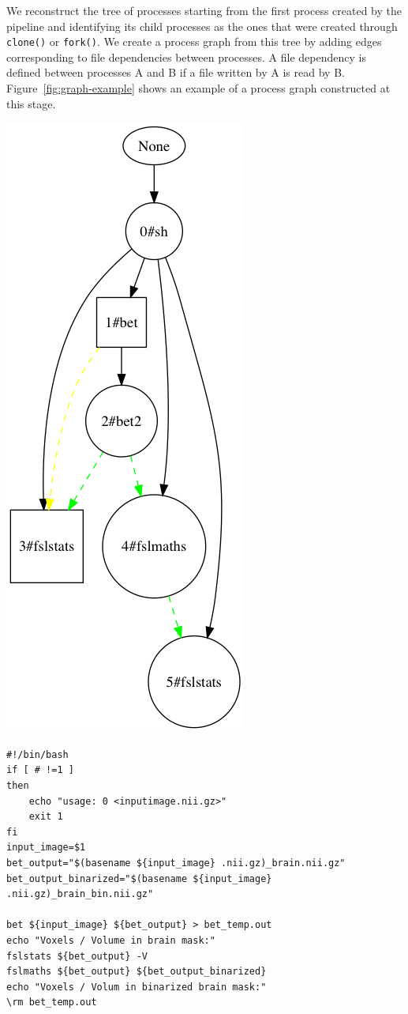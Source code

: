 \documentclass{article}
\begin{document}
We reconstruct the tree of processes starting from the first process
created by the pipeline and identifying its child processes as the ones
that were created through \texttt{clone()} or \texttt{fork()}. We
create a process graph from this tree by adding edges corresponding to
file dependencies between processes. A file dependency is defined
between processes A and B if a file written by A is read by
B. Figure~\ref{fig:graph-example} shows an example of a process graph
constructed at this stage.

\medskip
\noindent
\begin{minipage}[]{.5\linewidth}
  \centering
  \includegraphics[scale=0.2,width=.4\linewidth]{images/simple_graph}
\end{minipage}
\begin{minipage}[]{.3\linewidth}
\small{}\label{sample_script}
{\scriptsize
\begin{verbatim}
#!/bin/bash
if [ # !=1 ]
then
    echo "usage: 0 <inputimage.nii.gz>"
    exit 1
fi
input_image=$1
bet_output="$(basename ${input_image} .nii.gz)_brain.nii.gz"
bet_output_binarized="$(basename ${input_image} .nii.gz)_brain_bin.nii.gz"

bet ${input_image} ${bet_output} > bet_temp.out
echo "Voxels / Volume in brain mask:"
fslstats ${bet_output} -V
fslmaths ${bet_output} ${bet_output_binarized}
echo "Voxels / Volum in binarized brain mask:"
\rm bet_temp.out
\end{verbatim}
}
\end{minipage}
\end{document}

